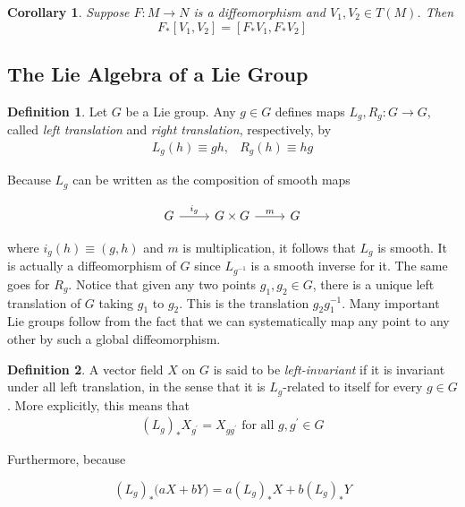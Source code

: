 \documentclass{article}
\newtheorem{corollary}{Corollary}[theorem]
\theoremstyle{remark}
\theoremstyle{definition}
\newtheorem{definition}{Definition}[section]
\begin{document}
    \begin{corollary}
      Suppose $F: M \longrightarrow N$ is a diffeomorphism and $V_1, V_2 \in T(M)$. Then 
        \[F_* [V_1, V_2] = [F_* V_1, F_* V_2]\]
    \end{corollary}

  \subsection{The Lie Algebra of a Lie Group}

    \begin{definition}
      Let $G$ be a Lie group. Any $g \in G$ defines maps $L_g, R_g : G \longrightarrow G$, called \textit{left translation} and \textit{right translation}, respectively, by 
      \begin{align*}
        L_g (h) \equiv g h , & R_g (h) \equiv h g
      \end{align*}
    \end{definition}

    Because $L_g$ can be written as the composition of smooth maps 

      \[\begin{tikzcd}
      G \arrow{r}{i_g} & G \times G \arrow{r}{m} & G
      \end{tikzcd}\]

    where $i_g (h) \equiv (g, h)$ and $m$ is multiplication, it follows that $L_g$ is smooth. It is actually a diffeomorphism of $G$ since $L_{g^{-1}}$ is a smooth inverse for it. The same goes for $R_g$. Notice that given any two points $g_1, g_2 \in G$, there is a unique left translation of $G$ taking $g_1$ to $g_2$. This is the translation $g_2 g_1^{-1}$. Many important Lie groups follow from the fact that we can systematically map any point to any other by such a global diffeomorphism. 

    \begin{definition}
      A vector field $X$ on $G$ is said to be \textit{left-invariant} if it is invariant under all left translation, in the sense that it is $L_g$-related to itself for every $g \in G$. More explicitly, this means that
      \begin{align*}
        (L_g)_* X_{g^\prime} = X_{g g^\prime} \text{ for all } g, g^\prime \in G
      \end{align*}
    \end{definition}

    Furthermore, because

      \[(L_g)_* \big( a X + b Y \big) = a (L_g)_* X + b (L_g)_* Y\]
\end{document}
